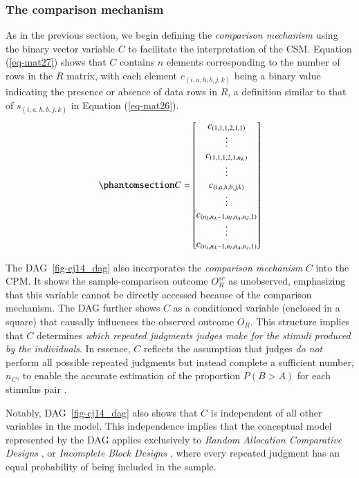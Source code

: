 \documentclass[
  authoryear,
  review,
  1p]{elsarticle}
\begin{document}
\subsubsection{The comparison
mechanism}\label{sec-theory-theoretical_SC2}

As in the previous section, we begin defining the \emph{comparison
mechanism} using the binary vector variable \(C\) to facilitate the
interpretation of the CSM. Equation (\ref{eq-mat27}) shows that \(C\)
contains \(n\) elements corresponding to the number of rows in the \(R\)
matrix, with each element \(c_{(i,a,h,b,j,k)}\) being a binary value
indicating the presence or absence of data rows in \(R\), a definition
similar to that of \(s_{(i,a,h,b,j,k)}\) in Equation (\ref{eq-mat26}).
\begin{equation}\phantomsection\label{eq-mat27}{
C = \begin{bmatrix}
c_{(1,1,1,2,1,1)} \\
\vdots \\
c_{(1,1,1,2,1,n_{K})} \\
\vdots \\
c_{(i,a,h,b,j,k)} \\
\vdots \\
c_{(n_{I},n_{A}-1,n_{I},n_{A},n_{J},1)} \\
\vdots \\
c_{(n_{I},n_{A}-1,n_{I},n_{A},n_{J},1)}
\end{bmatrix}
}\end{equation}

The DAG~\ref{fig-cj14_dag} also incorporates the \emph{comparison
mechanism} \(C\) into the CPM. It shows the sample-comparison outcome
\(O^{sc}_{R}\) as unobserved, emphasizing that this variable cannot be
directly accessed because of the comparison mechanism. The DAG further
shows \(C\) as a conditioned variable (enclosed in a square) that
causally influences the observed outcome \(O_{R}\). This structure
implies that \(C\) determines \emph{which repeated judgments judges make
for the stimuli produced by the individuals}. In essence, \(C\) reflects
the assumption that judges \emph{do not} perform all possible repeated
judgments but instead complete a sufficient number, \(n_{C}\), to enable
the accurate estimation of the proportion \(P(B>A)\) for each stimulus
pair \citep[p.~267]{Thurstone_1927b}.

Notably, DAG~\ref{fig-cj14_dag} also shows that \(C\) is independent of
all other variables in the model. This independence implies that the
conceptual model represented by the DAG applies exclusively to
\emph{Random Allocation Comparative Designs} \citep{Bramley_2015}, or
\emph{Incomplete Block Designs} \citep{Lawson_2015}, where every
repeated judgment has an equal probability of being included in the
sample.
\end{document}
